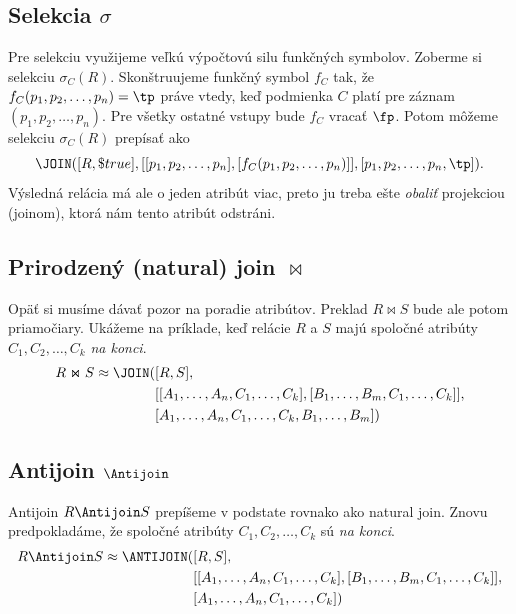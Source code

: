 \subsection*{Selekcia $\sigma$}
Pre selekciu využijeme veľkú výpočtovú silu funkčných symbolov. Zoberme si selekciu $\sigma_C(R)$.
Skonštruujeme funkčný symbol $f_C$ tak, že $f_C(p_1, p_2, \dots, p_n) = \tp$ práve vtedy, keď
podmienka $C$ platí pre záznam $(p_1, p_2, \dots, p_n)$. Pre všetky ostatné vstupy bude $f_C$ vracať
$\fp$. Potom môžeme selekciu $\sigma_C(R)$ prepísať ako
$$\JOIN([R, \$true], [[p_1, p_2, \dots, p_n], [f_C(p_1, p_2, \dots, p_n)]], [p_1, p_2, \dots, p_n,
\tp])\text{.}$$ Výsledná relácia má ale o jeden atribút viac, preto ju treba ešte \textit{obaliť}
projekciou (joinom), ktorá nám tento atribút odstráni.

\subsection*{Prirodzený (natural) join $\Join$}
Opäť si musíme dávať pozor na poradie atribútov. Preklad $R \Join S$ bude ale potom priamočiary.
Ukážeme na príklade, keď relácie $R$ a $S$ majú spoločné atribúty $C_1, C_2, \dots, C_k$ \textit{na
konci}.
\begin{align*}
    R \Join S \approx \JOIN(&[R, S], \\
                            &[[A_1, \dots, A_n, C_1, \dots, C_k], [B_1, \dots, B_m, C_1, \dots, C_k]], \\
                            &[A_1, \dots, A_n, C_1, \dots, C_k, B_1, \dots, B_m])
\end{align*}

\subsection*{Antijoin $\Antijoin$}
Antijoin $R \Antijoin S$ prepíšeme v podstate rovnako ako natural join. Znovu predpokladáme, že
spoločné atribúty $C_1, C_2, \dots, C_k$ sú \textit{na konci}.
\begin{align*}
    R \Antijoin S \approx \ANTIJOIN(&[R, S], \\
                            &[[A_1, \dots, A_n, C_1, \dots, C_k], [B_1, \dots, B_m, C_1, \dots, C_k]], \\
                            &[A_1, \dots, A_n, C_1, \dots, C_k])
\end{align*}

